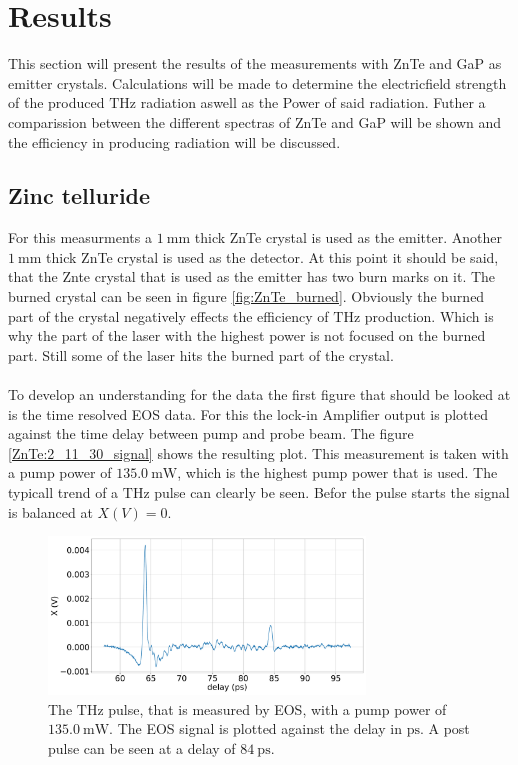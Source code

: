 \chapter{Results}
This section will present the results of the measurements with ZnTe and GaP as emitter crystals.
Calculations will be made to determine the electricfield strength of the produced $\si{\tera\hertz}$ radiation aswell as the Power of said radiation.
Futher a comparission between the different spectras of ZnTe and GaP will be shown and the efficiency in producing radiation will be discussed.

\section{Zinc telluride}
For this measurments a $\SI{1}{\milli\meter}$ thick ZnTe crystal is used as the emitter.
Another $\SI{1}{\milli\meter}$ thick ZnTe crystal is used as the detector.
At this point it should be said, that the Znte crystal that is used as the emitter has two burn marks on it.
The burned crystal can be seen in figure \ref{fig:ZnTe_burned}.
Obviously the burned part of the crystal negatively effects the efficiency of $\si{\tera\hertz}$ production.
Which is why the part of the laser with the highest power is not focused on the burned part.
Still some of the laser hits the burned part of the crystal.
\\\\
To develop an understanding for the data the first figure that should be looked at is the time resolved EOS data.
For this the lock-in Amplifier output is plotted against the time delay between pump and probe beam.
The figure \ref{ZnTe:2_11_30_signal} shows the resulting plot.
This measurement is taken with a pump power of $\SI{135.0}{\milli\W}$, which is the highest pump power that is used.
The typicall trend of a $\si{\tera\hertz}$ pulse can clearly be seen.
Befor the pulse starts the signal is balanced at $X(V)=0$.
\begin{figure}
    \centering
    \includegraphics[width=0.75\textwidth]{Plots/2_11_30_20normalX.pdf}
    \caption{The $\si{\tera\hertz}$ pulse, that is measured by EOS, with a pump power of $\SI{135.0}{\milli\W}$.
    The EOS signal is plotted against the delay in $\si{\pico\second}$.
    A post pulse can be seen at a delay of $\SI{84}{\pico\second}$.}
    \label{ZnTe:2_11_30_20_signal}
\end{figure}
